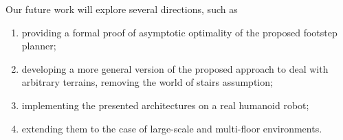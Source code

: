 
Our future work will explore several directions, such as
\begin{enumerate}
    \item providing a formal proof of asymptotic optimality of the proposed footstep planner;
    \item developing a more general version of the proposed approach to deal with arbitrary terrains, removing the world of stairs assumption;
    \item implementing the presented architectures on a real humanoid robot;
    \item extending them to the case of large-scale and multi-floor environments.
\end{enumerate}
